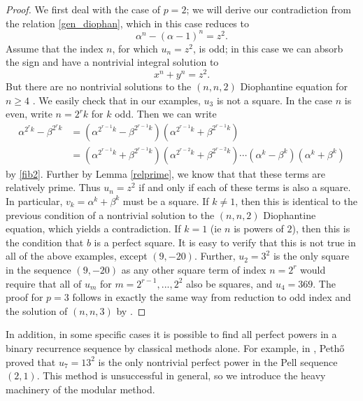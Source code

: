 \documentclass[12pt]{amsart}
\theoremstyle{definition}
\begin{document}
\begin{proof}

We first deal with the case of $p=2$; we will derive our contradiction from the relation \eqref{gen_diophan}, which in this case reduces to
\begin{equation}\label{binetform} \alpha^n - (\alpha-1)^n = z^2.\end{equation} 
Assume that the index $n$, for which $u_n = z^2$, is odd; in this case we can absorb the sign and have a nontrivial integral solution to
\[ x^n +y^n = z^2. \]
But there are no nontrivial solutions to the $(n,n,2)$ Diophantine equation for $n \geq 4$  \cite{darmon97} .  We easily check that in our examples, $u_3$ is not a square.  In the case $n$ is even, write $n=2^rk$ for $k$ odd.  Then we can write
\begin{align*}
\alpha^{2^rk} - \beta^{2^rk} & = (\alpha^{2^{r-1}k} - \beta^{2^{r-1}k})(\alpha^{2^{r-1}k} + \beta^{2^{r-1}k}) \\
& = (\alpha^{2^{r-1}k} + \beta^{2^{r-1}k})(\alpha^{2^{r-2}k} + \beta^{2^{r-2}k}) \cdots (\alpha^{k} - \beta^{k}) (\alpha^{k} + \beta^{k})
\end{align*}
by \eqref{fib2}.  Further by Lemma \ref{relprime}, we know that that these terms are relatively prime.  Thus $u_n=z^2$ if and only if each of these terms is also a square.  In particular, $v_k = \alpha^k + \beta^k$ must be a square.  If $k \neq 1$, then this is identical to the previous condition of a nontrivial solution to the $(n,n,2)$ Diophantine equation, which yields a contradiction.  If $k = 1$ (ie $n$ is powers of $2$), then this is the condition that $b$ is a perfect square.  It is easy to verify that this is not true in all of the above examples, except $(9,-20)$.  Further, $u_2 = 3^2$ is the only square in the sequence $(9,-20)$ as any other square term of index $n = 2^r$ would require that all of $u_m$ for $m = 2^{r-1},...,2^2$ also be squares, and $u_4 = 369$.  The proof for $p=3$ follows in exactly the same way from reduction to odd index and the solution of $(n,n,3)$ by \cite{darmon97}.

\end{proof}

In addition, in some specific cases it is possible to find all perfect powers in a binary recurrence sequence by classical methods alone.  For example, in \cite{petho92}, Peth{\H{o}} proved that $u_7 = 13^2$ is the only nontrivial perfect power in the Pell sequence $(2,1)$.  This method is unsuccessful in general, so we introduce the heavy machinery of the modular method.
\end{document}
